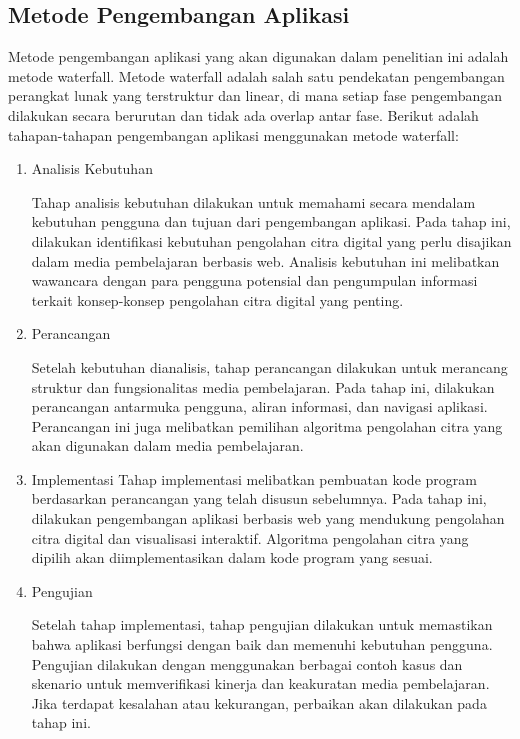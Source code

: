 \subsection{Metode Pengembangan Aplikasi}
Metode pengembangan aplikasi yang akan digunakan dalam penelitian ini adalah metode waterfall. Metode waterfall adalah salah satu pendekatan pengembangan perangkat lunak yang terstruktur dan linear, di mana setiap fase pengembangan dilakukan secara berurutan dan tidak ada overlap antar fase. Berikut adalah tahapan-tahapan pengembangan aplikasi menggunakan metode waterfall:

\begin{enumerate}[leftmargin=1cm, itemindent=0.6cm,labelwidth=15pt, labelsep=5pt, listparindent=1cm,align=left]

    \item Analisis Kebutuhan

    Tahap analisis kebutuhan dilakukan untuk memahami secara mendalam kebutuhan pengguna dan tujuan dari pengembangan aplikasi. Pada tahap ini, dilakukan identifikasi kebutuhan pengolahan citra digital yang perlu disajikan dalam media pembelajaran berbasis web. Analisis kebutuhan ini melibatkan wawancara dengan para pengguna potensial dan pengumpulan informasi terkait konsep-konsep pengolahan citra digital yang penting.

    \item Perancangan

    Setelah kebutuhan dianalisis, tahap perancangan dilakukan untuk merancang struktur dan fungsionalitas media pembelajaran. Pada tahap ini, dilakukan perancangan antarmuka pengguna, aliran informasi, dan navigasi aplikasi. Perancangan ini juga melibatkan pemilihan algoritma pengolahan citra yang akan digunakan dalam media pembelajaran.

    \item Implementasi
    Tahap implementasi melibatkan pembuatan kode program berdasarkan perancangan yang telah disusun sebelumnya. Pada tahap ini, dilakukan pengembangan aplikasi berbasis web yang mendukung pengolahan citra digital dan visualisasi interaktif. Algoritma pengolahan citra yang dipilih akan diimplementasikan dalam kode program yang sesuai.

    \item Pengujian

    Setelah tahap implementasi, tahap pengujian dilakukan untuk memastikan bahwa aplikasi berfungsi dengan baik dan memenuhi kebutuhan pengguna. Pengujian dilakukan dengan menggunakan berbagai contoh kasus dan skenario untuk memverifikasi kinerja dan keakuratan media pembelajaran. Jika terdapat kesalahan atau kekurangan, perbaikan akan dilakukan pada tahap ini.


\end{enumerate}

